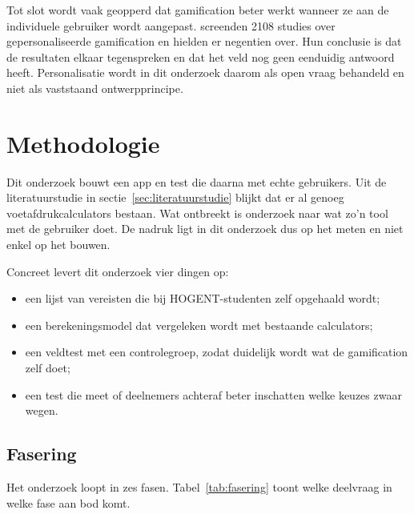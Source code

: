 \documentclass{hogent-article}
\begin{document}
    Tot slot wordt vaak geopperd dat gamification beter werkt wanneer ze aan de
    individuele gebruiker wordt aangepast. \textcite{Oliveira2023} screenden 2108
    studies over gepersonaliseerde gamification en hielden er negentien over. Hun
    conclusie is dat de resultaten elkaar tegenspreken en dat het veld nog geen
    eenduidig antwoord heeft. Personalisatie wordt in dit onderzoek daarom als open
    vraag behandeld en niet als vaststaand ontwerpprincipe.
    
    \section{Methodologie}%
    \label{sec:methodologie}
    
    Dit onderzoek bouwt een app en test die daarna met echte gebruikers. Uit de
    literatuurstudie in sectie~\ref{sec:literatuurstudie} blijkt dat er al genoeg
    voetafdrukcalculators bestaan. Wat ontbreekt is onderzoek naar wat zo'n tool
    met de gebruiker doet. De nadruk ligt in dit onderzoek dus op het meten en niet
    enkel op het bouwen.
    
    Concreet levert dit onderzoek vier dingen op:
    
    \begin{itemize}
        \item een lijst van vereisten die bij HOGENT-studen\-ten zelf opgehaald wordt;
        \item een berekeningsmodel dat vergeleken wordt met bestaande calculators;
        \item een veldtest met een controlegroep, zodat duidelijk wordt wat de
        gamification zelf doet;
        \item een test die meet of deelnemers achteraf beter inschatten welke keuzes
        zwaar wegen.
    \end{itemize}
    
    \subsection{Fasering}%
    \label{ssec:fasering}
    
    Het onderzoek loopt in zes fasen. Tabel~\ref{tab:fasering} toont welke deelvraag
    in welke fase aan bod komt.
    
\end{document}
